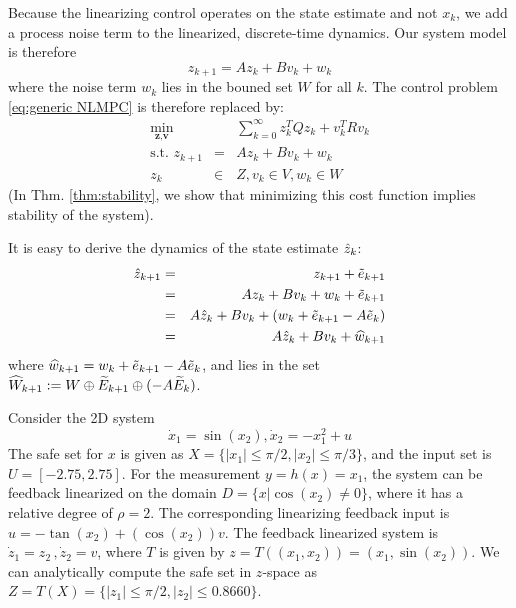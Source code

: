 Because the linearizing control operates on the state estimate and not $x_k$, we add a process noise term to the linearized, discrete-time dynamics. 
Our system model is therefore
\begin{equation}
\label{eq:discrete linear dyn}
z_{k+1} = Az_k + Bv_k + w_k
\end{equation}
where the noise term $w_k$ lies in the bouned set $W$ for all $k$.
The control problem \eqref{eq:generic NLMPC} is therefore replaced by:
\begin{eqnarray}
\label{eq:discrete linear problem}
\min_{\textbf{z},\textbf{v}} &\;& \sum_{k=0}^{\infty}z_k^TQz_k + v_k^TRv_k \\
\text{s.t. } z_{k+1} &=& Az_k + Bv_k + w_k\nonumber \\
z_k&\in& Z,  v_k \in V,w_k \in W  \nonumber
\end{eqnarray}
(In Thm. \ref{thm:stability}, we show that minimizing this cost function implies stability of the system).

It is easy to derive the dynamics of the state estimate $\hat{z}_{k}$: 
\begin{eqnarray}
\label{eq:dynamics_estimate}
\hat{z}_{k+1} &=& z_{k+1} + \tilde{e}_{k+1} \\
&=&Az_k + Bv_k + w_k + \tilde{e}_{k+1}  \nonumber\\
&=&A\hat{z}_k + Bv_k + (w_k+ \tilde{e}_{k+1} -A \tilde{e}_{k}) \nonumber\\
&=&A\hat{z}_k + Bv_k + \widehat{w}_{k+1} \nonumber
\end{eqnarray}
where $\widehat{w}_{k+1} = w_k+ \tilde{e}_{k+1} -A \tilde{e}_{k}$, and lies in the set $\widehat{W}_{k+1} := W\oplus\widetilde{E}_{k+1}\oplus(-A\widetilde{E}_k)$. 

\begin{exmp}
	Consider the 2D system 
	\begin{equation}
	\label{eq:toy_dynamics}
	\dot{x}_1 = \sin(x_2) , \dot{x}_2 =-x_1^2 + u 
	\end{equation}
	The safe set for $x$ is given as $X = \lbrace |x_1| \leq \pi /2, |x_2| \leq \pi/3 \rbrace$, and the input set is $U = [-2.75, 2.75]$.
	For the measurement $y = h(x) = x_1$, the system can be feedback linearized on the domain $D = \lbrace x | \cos(x_2) \neq 0 \rbrace $, where it has a relative degree of $\rho=2$. 
	The corresponding linearizing feedback input is $u = -\tan(x_2) + (\cos(x_2))v$.
	The feedback linearized system is $\dot{z}_1 = z_2\, ,\dot{z}_2 = v$, where $T$ is given by $z=T((x_1,x_2)) = (x_1, \sin(x_2))$.	
	We can analytically compute the safe set in $z$-space as $Z = T(X) =  \lbrace |z_1| \leq \pi /2, |z_2| \leq 0.8660\rbrace$.
	\exmend
\end{exmp}

